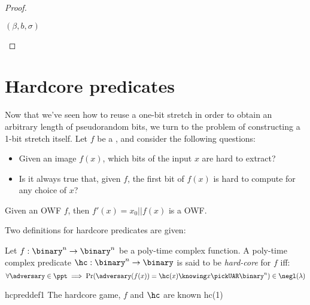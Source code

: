 \begin{proof}
\begin{cryptoredux}
        \cseqdelay

        {$(\beta, b, \sigma)$}{}
        
        \cseqdelay

    
    \end{cryptoredux}

\end{proof}

\section{Hardcore predicates}

Now that we've seen how to reuse a one-bit stretch \prg{} in order to obtain an arbitrary length of pseudorandom bits, we turn to the problem of constructing a 1-bit stretch \prg{} itself. Let $f$ be a \owf{}, and consider the following questions:
\begin{itemize}
    \item Given an image $f(x)$, which bits of the input $x$ are hard to extract?
    \item Is it always true that, given $f$, the first bit of $f(x)$ is hard to compute for any choice of $x$?
\end{itemize}

\begin{example}
    Given an OWF $f$, then $f'(x) = x_0 || f(x)$ is a OWF.
\end{example}

Two definitions for hardcore predicates are given:

\begin{definition}
    Let $f : \binary^n \to \binary^n$ be a poly-time complex function. A poly-time complex predicate $\hc : \binary^n \to \binary $ is said to be \emph{hard-core} for $f$ iff:
    \[
        \forall \adversary \in \ppt \implies \Pr(\adversary(f(x)) = \hc(x) \knowing x \pickUAR \binary^n) \in \negl(\lambda) 
    \]
\end{definition}

\begin{cryptogame}
    {hcpreddef1}
    {The hardcore game, $f$ and $\hc$ are known}
    {hc(1)}

\end{cryptogame}

